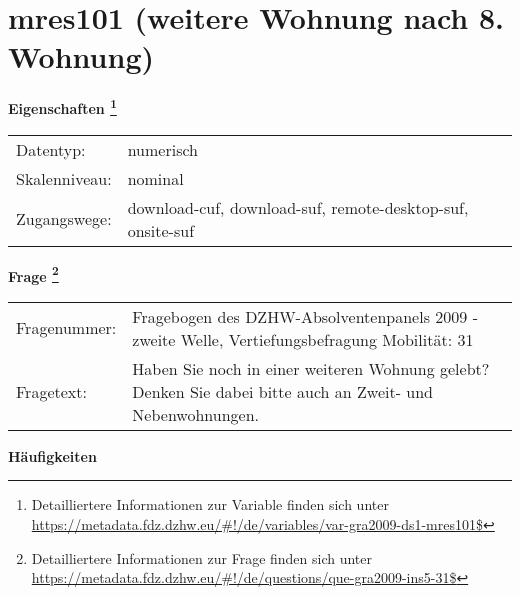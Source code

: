 
    \setcounter{footnote}{0}

    \vspace*{-1.8cm}
	\section{mres101 (weitere Wohnung nach 8. Wohnung)}
	\label{section:mres101}



    \vspace*{0.5cm}
    \noindent\textbf{Eigenschaften
	\footnote{Detailliertere Informationen zur Variable finden sich unter
		\url{https://metadata.fdz.dzhw.eu/\#!/de/variables/var-gra2009-ds1-mres101$}}}\\
	\begin{tabularx}{\hsize}{@{}lX}
	Datentyp: & numerisch \\
	Skalenniveau: & nominal \\
	Zugangswege: &
	  download-cuf, 
	  download-suf, 
	  remote-desktop-suf, 
	  onsite-suf
 \\
    \end{tabularx}



				\vspace*{0.5cm}
                \noindent\textbf{Frage
	                \footnote{Detailliertere Informationen zur Frage finden sich unter
		              \url{https://metadata.fdz.dzhw.eu/\#!/de/questions/que-gra2009-ins5-31$}}}\\
				\begin{tabularx}{\hsize}{@{}lX}
					Fragenummer: &
					  Fragebogen des DZHW-Absolventenpanels 2009 - zweite Welle, Vertiefungsbefragung Mobilität:
					  31
 \\
					Fragetext: & Haben Sie noch in einer weiteren Wohnung gelebt? Denken Sie dabei bitte auch an Zweit- und Nebenwohnungen. \\
				\end{tabularx}





        		\vspace*{0.5cm}
                \noindent\textbf{Häufigkeiten}

